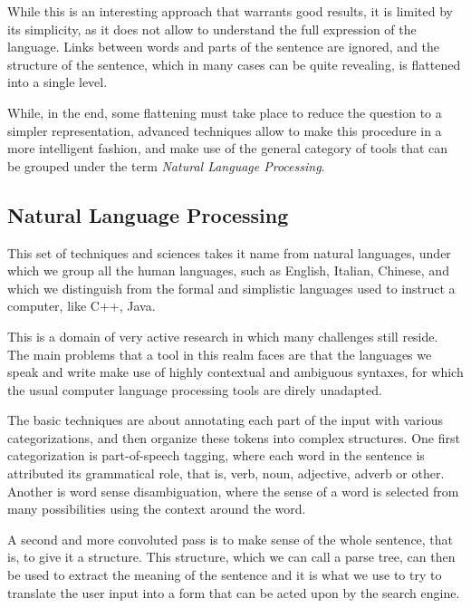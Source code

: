 While this is an interesting approach that warrants good results, it is limited by its simplicity, as it does not allow to understand the full expression of the language. Links between words and parts of the sentence are ignored, and the structure of the sentence, which in many cases can be quite revealing, is flattened into a single level.

While, in the end, some flattening must take place to reduce the question to a simpler representation, advanced techniques allow to make this procedure in a more intelligent fashion, and make use of the general category of tools that can be grouped under the term \emph{Natural Language Processing}.

\subsection{Natural Language Processing} %
\label{sub:natural_language_processing}

This set of techniques and sciences takes it name from natural languages, under which we group all the human languages, such as English, Italian, Chinese, and which we distinguish from the formal and simplistic languages used to instruct a computer, like C++, Java.

This is a domain of very active research in which many challenges still reside. The main problems that a tool in this realm faces are that the languages we speak and write make use of highly contextual and ambiguous syntaxes, for which the usual computer language processing tools are direly unadapted.

The basic techniques are about annotating each part of the input with various categorizations, and then organize these tokens into complex structures. One first categorization is part-of-speech tagging, where each word in the sentence is attributed its grammatical role, that is, verb, noun, adjective, adverb or other. Another is word sense disambiguation, where the sense of a word is selected from many possibilities using the context around the word.

A second and more convoluted pass is to make sense of the whole sentence, that is, to give it a structure. This structure, which we can call a parse tree, can then be used to extract the meaning of the sentence and it is what we use to try to translate the user input into a form that can be acted upon by the search engine.


